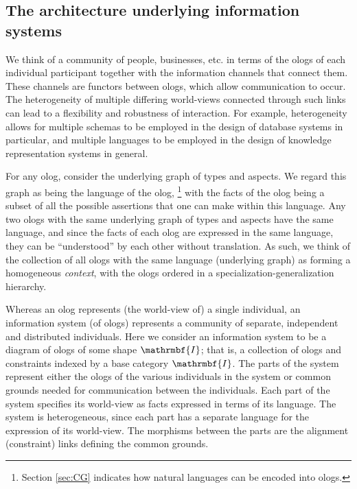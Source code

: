 \subsection{The architecture underlying information systems}

We think of a community of people, businesses, etc. in terms of the ologs of each individual participant together with the information channels that connect them. These channels are functors between ologs, which allow communication to occur. The heterogeneity of multiple differing world-views 
connected through such links can lead to a flexibility and robustness of interaction. 
For example, heterogeneity allows for multiple schemas to be employed in the design of database systems in particular, 
and multiple languages to be employed in the design of knowledge representation systems in general.

For any olog, consider the underlying graph of types and aspects. 
We regard this graph as being the language of the olog, 
\footnote{Section \ref{sec:CG} indicates how natural languages can be encoded into ologs.}
with the facts of the olog being a subset of all the possible assertions that one can make within this language.
Any two ologs with the same underlying graph of types and aspects have the same language,
and since the facts of each olog are expressed in the same language,
they can be ``understood'' by each other without translation.
As such, 
we think of the collection of all ologs with the same language (underlying graph) as forming a homogeneous {\em context},
with the ologs ordered in a specialization-generalization hierarchy. 

Whereas an olog represents (the world-view of) a single individual,
an information system (of ologs) represents a community of separate, independent and distributed individuals.
Here we consider an information system to be a diagram of ologs of some shape $\mathrmbf{I}$;
that is,
a collection of ologs and constraints indexed by a base category $\mathrmbf{I}$.
The parts of the system represent 
either the ologs of the various individuals in the system 
or common grounds needed for communication between the individuals.
Each part of the system specifies its world-view as facts expressed in terms of its language.
The system is heterogeneous, since each part has a separate language for the expression of its world-view. 
The morphisms between the parts are the alignment (constraint) links defining the common grounds. 

